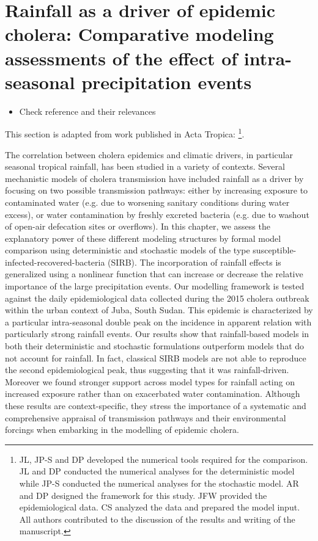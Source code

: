 \chapter{Rainfall as a driver of epidemic cholera: Comparative modeling assessments of the effect of intra-seasonal precipitation events}\label{ch:cholera-rainfall}

\begin{itemize}
	\item Check reference and their relevances
\end{itemize}

This section is adapted from work published in Acta Tropica:
\footnote{JL, JP-S and DP developed the numerical tools required for the comparison. JL and DP conducted the numerical analyses for the deterministic model while JP-S conducted the numerical analyses for the stochastic model. AR and DP designed the framework for this study. JFW provided the epidemiological data. CS analyzed the data and prepared the model input. All authors contributed to the discussion of the results and writing of the manuscript.}.


The correlation between cholera epidemics and climatic drivers, in particular seasonal tropical rainfall, has been studied in a variety of contexts. Several mechanistic models of cholera transmission have included rainfall as a driver by focusing on two possible transmission pathways: either by increasing exposure to contaminated water (e.g. due to worsening sanitary conditions during water excess), or water contamination by freshly excreted bacteria (e.g. due to washout of open-air defecation sites or overflows). In this chapter, we assess the explanatory power of these different modeling structures by formal model comparison using deterministic and stochastic models of the type susceptible-infected-recovered-bacteria (SIRB). The incorporation of rainfall effects is generalized using a nonlinear function that can increase or decrease the relative importance of the large precipitation events. Our modelling framework is tested against the daily epidemiological data collected during the 2015 cholera outbreak within the urban context of Juba, South Sudan. This epidemic is characterized by a particular intra-seasonal double peak on the incidence in apparent relation with particularly strong rainfall events. Our results show that rainfall-based models in both their deterministic and stochastic formulations outperform models that do not account for rainfall. In fact, classical SIRB models are not able to reproduce the second epidemiological peak, thus suggesting that it was rainfall-driven. Moreover we found stronger support across model types for rainfall acting on increased exposure rather than on exacerbated water contamination. Although these results are context-specific, they stress the importance of a systematic and comprehensive appraisal of transmission pathways and their environmental forcings when embarking in the modelling of epidemic cholera.


